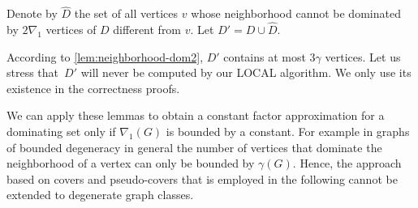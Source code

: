 \begin{tcolorbox}
Denote by $\hat D$ the set of all vertices $v$
whose neighborhood cannot be dominated
by $2\nabla_1$ vertices of $D$ different from $v$.
Let $D'=D\cup \hat D$.
\end{tcolorbox}

According to %
\cref{lem:neighborhood-dom2}, $D'$ contains at most
$3\gamma$ vertices.
Let us stress that~$D'$ will never be computed by our LOCAL algorithm. We only use
its existence in the correctness proofs.

\smallskip
We can apply these
lemmas to obtain a constant factor approximation for a dominating
set only if $\nabla_1(G)$ is bounded by a constant. For example in graphs of bounded degeneracy in general the number of vertices that dominate the
neighborhood of a vertex can only be bounded by $\gamma(G)$.
Hence, the approach based on covers and pseudo-covers that is employed
in the following cannot be extended to degenerate  graph classes.

